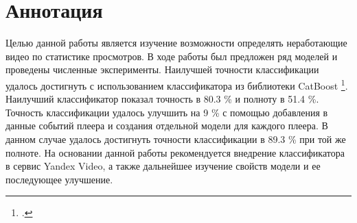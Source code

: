 
\chapter{Аннотация}

Целью данной работы является изучение возможности определять неработающие видео по статистике просмотров. В ходе работы был предложен ряд моделей и проведены численные эксперименты. Наилучшей точности классификации удалось достигнуть с использованием классификатора из библиотеки CatBoost \footcite{Prokhorenkova2017}. Наилучший классификатор показал точность в 80.3 \% и полноту в 51.4 \%. Точность классификации удалось улучшить на 9 \% с помощью добавления в данные событий плеера и создания отдельной модели для каждого плеера. В данном случае удалось достигнуть точности классификации в 89.3 \% при той же полноте. На основании данной работы рекомендуется внедрение классификатора в сервис Yandex Video, а также дальнейшее изучение свойств модели и ее последующее улучшение.